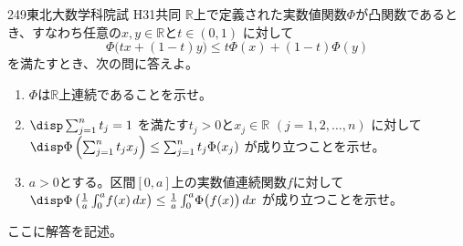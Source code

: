 \begin{prob}{249}{}{東北大数学科院試 H31共同}
 $\mathbb{R}$上で定義された実数値関数$\Phi$が凸関数であるとき、すなわち任意の$x,y\in\mathbb{R}$と$t\in (0,1)$ に対して
 \[ \Phi\bigl(tx+(1-t)y\bigr)\le t\Phi(x)+(1-t)\Phi(y) \]
 を満たすとき、次の問に答えよ。
 \begin{enumerate}
  \item $\Phi$は$\mathbb{R}$上連続であることを示せ。
  \item $\disp \sum_{j=1}^n t_j=1$ を満たす$t_j>0$と$x_j\in\mathbb{R}$ $(j=1,2,\dots, n)$ に対して $\disp \Phi\left(\sum_{j=1}^nt_jx_j\right)\le \sum_{j=1}^nt_j\Phi(x_j)$ が成り立つことを示せ。
  \item $a>0$とする。区間$[0,a]$上の実数値連続関数$f$に対して $\disp \Phi\left(\frac{1}{a}\int_0^a\!f(x)\,dx\right)\le\frac{1}{a}\int_0^a\!\Phi\bigl(f(x)\bigr)\,dx$ が成り立つことを示せ。
 \end{enumerate}
\end{prob}

ここに解答を記述。